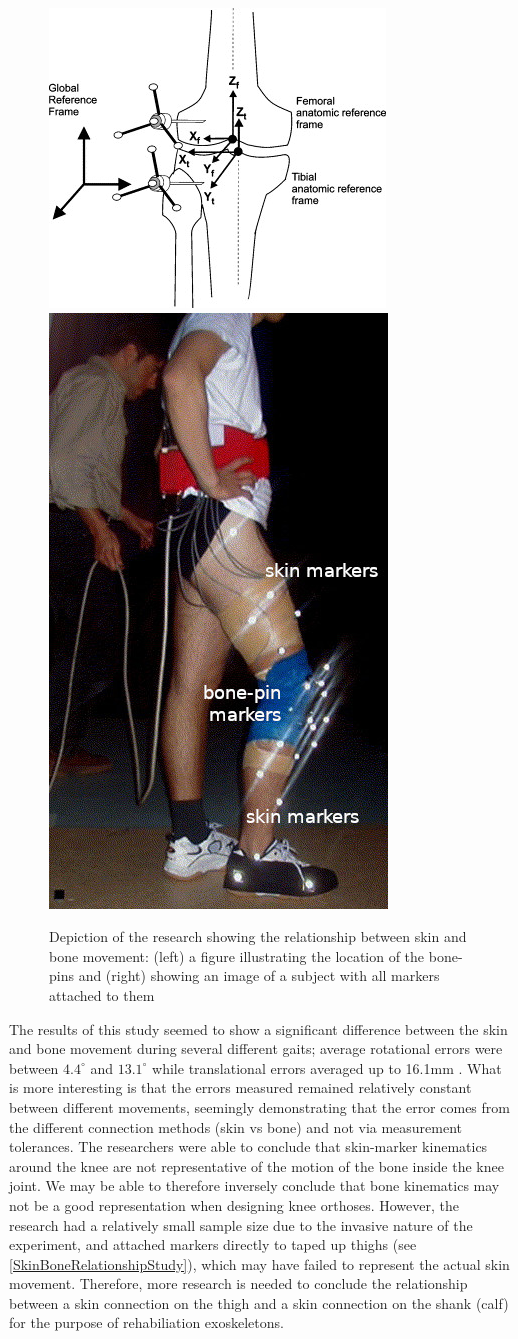 \begin{figure}[ht!]
    \centering
    \includegraphics[width=0.6\linewidth]{Figures/Background/SkinMovementResearch_Diagram.jpg}
    \includegraphics[width=0.3\linewidth]{Figures/Background/SkinMovementResearch_ImageMarked.jpg}
    \caption{Depiction of the research showing the relationship between skin and bone movement: (left) a figure illustrating the location of the bone-pins and (right) showing an image of a subject with all markers attached to them \cite{SkinMovementKneeKin}}
    \label{fig:SkinBoneRelationshipStudy}
\end{figure}

The results of this study seemed to show a significant difference between the skin and bone movement during several different gaits; average rotational errors were between \(4.4^\circ\) and \(13.1^\circ\) while translational errors averaged up to 16.1mm \cite{SkinMovementKneeKin}. What is more interesting is that the errors measured remained relatively constant between different movements, seemingly demonstrating that the error comes from the different connection methods (skin vs bone) and not via measurement tolerances. The researchers were able to conclude that skin-marker kinematics around the knee are not representative of the motion of the bone inside the knee joint. We may be able to therefore inversely conclude that bone kinematics may not be a good representation when designing knee orthoses. However, the research had a relatively small sample size due to the invasive nature of the experiment, and attached markers directly to taped up thighs (see \autoref{SkinBoneRelationshipStudy}), which may have failed to represent the actual skin movement. Therefore, more research is needed to conclude the relationship between a skin connection on the thigh and a skin connection on the shank (calf) for the purpose of rehabiliation exoskeletons.

